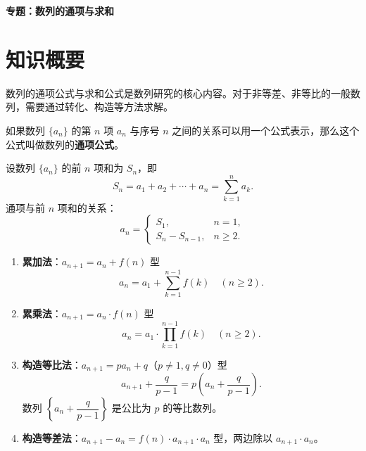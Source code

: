 \documentclass[11pt]{ctexrep}
\begin{document}
\begin{center}
    {\LARGE\bfseries 专题：数列的通项与求和}
\end{center}

\section*{知识概要}

数列的通项公式与求和公式是数列研究的核心内容。对于非等差、非等比的一般数列，需要通过转化、构造等方法求解。

\begin{definition}[数列的通项公式]
    如果数列 $\{a_n\}$ 的第 $n$ 项 $a_n$ 与序号 $n$ 之间的关系可以用一个公式表示，那么这个公式叫做数列的\textbf{通项公式}。
\end{definition}

\begin{definition}[数列的前 $n$ 项和]
    设数列 $\{a_n\}$ 的前 $n$ 项和为 $S_n$，即
    \[
        S_n = a_1 + a_2 + \cdots + a_n = \sum_{k=1}^{n} a_k.
    \]
    通项与前 $n$ 项和的关系：
    \[
        a_n = \begin{cases}
            S_1, & n = 1, \\[6pt]
            S_n - S_{n-1}, & n \geq 2.
        \end{cases}
    \]
\end{definition}

\begin{property}[由递推公式求通项的常见类型]
    \begin{enumerate}
        \item \textbf{累加法}：$a_{n+1} = a_n + f(n)$ 型
        \[
            a_n = a_1 + \sum_{k=1}^{n-1} f(k) \quad (n \geq 2).
        \]
        
        \item \textbf{累乘法}：$a_{n+1} = a_n \cdot f(n)$ 型
        \[
            a_n = a_1 \cdot \prod_{k=1}^{n-1} f(k) \quad (n \geq 2).
        \]
        
        \item \textbf{构造等比法}：$a_{n+1} = pa_n + q$（$p \neq 1, q \neq 0$）型
        \[
            a_{n+1} + \frac{q}{p-1} = p\left(a_n + \frac{q}{p-1}\right).
        \]
        数列 $\left\{a_n + \dfrac{q}{p-1}\right\}$ 是公比为 $p$ 的等比数列。
        
        \item \textbf{构造等差法}：$a_{n+1} - a_n = f(n) \cdot a_{n+1} \cdot a_n$ 型，两边除以 $a_{n+1} \cdot a_n$。
    \end{enumerate}
\end{property}
\end{document}
